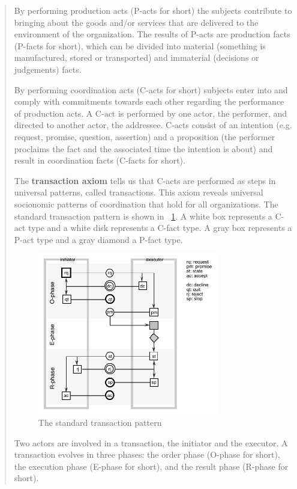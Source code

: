 \begin{quotation}
By performing production acts (P-acts for short) the subjects contribute to bringing about the goods and/or services that are delivered to the environment of the organization. The results of P-acts are production facts (P-facts for short), which can be divided into material (something is manufactured, stored or transported) and immaterial (decisions or judgements) facts.

By performing coordination acts (C-acts for short) subjects enter into and comply with commitments towards each other regarding the performance of production acts. A C-act is performed by one actor, the performer, and directed to another actor, the addressee. C-acts consist of an intention (e.g. request, promise, question, assertion) and a proposition (the performer proclaims the fact and the associated time the intention is about) and result in coordination facts (C-facts for short).

The \textbf{transaction axiom} tells us that C-acts are performed as steps in universal patterns, called transactions. This axiom reveals universal socionomic patterns of coordination that hold for all organizations. The standard transaction pattern is shown in~ \cref{fig:TransactionPattern}. A white box represents a C-act type and a white disk represents a C-fact type. A gray box represents a P-act type and a gray diamond a P-fact type. 

\begin{figure}[ht!] 
	\centering
    \includegraphics[width=8cm, keepaspectratio]{img/TransactionPattern}    
    \caption{The standard transaction pattern }
    \label{fig:TransactionPattern}
\end{figure}

Two actors are involved in a transaction, the initiator and the executor. A transaction evolves in three phases: the order phase (O-phase for short), the execution phase (E-phase for short), and the result phase (R-phase for short).


\end{quotation}

